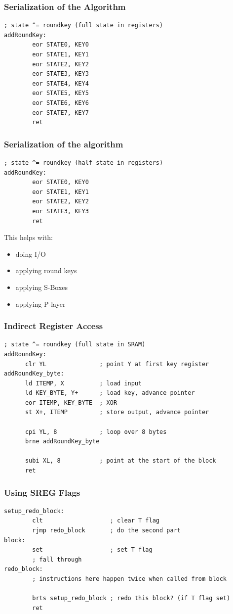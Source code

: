\documentclass{beamer}
\begin{document}
\begin{frame}[fragile]
\frametitle{Serialization of the Algorithm}
\begin{lstlisting}
; state ^= roundkey (full state in registers)
addRoundKey:
        eor STATE0, KEY0
        eor STATE1, KEY1
        eor STATE2, KEY2
        eor STATE3, KEY3
        eor STATE4, KEY4
        eor STATE5, KEY5
        eor STATE6, KEY6
        eor STATE7, KEY7
        ret
\end{lstlisting}
\end{frame}

\begin{frame}[fragile]
\frametitle{Serialization of the algorithm}
\begin{lstlisting}
; state ^= roundkey (half state in registers)
addRoundKey:
        eor STATE0, KEY0
        eor STATE1, KEY1
        eor STATE2, KEY2
        eor STATE3, KEY3
        ret
\end{lstlisting}

This helps with:
\begin{itemize}
        \item doing I/O
        \item applying round keys
        \item applying S-Boxes
        \item applying P-layer
\end{itemize}

\end{frame}

\begin{frame}[fragile]
\frametitle{Indirect Register Access}
\begin{lstlisting}
; state ^= roundkey (full state in SRAM)
addRoundKey:
      clr YL               ; point Y at first key register
addRoundKey_byte:
      ld ITEMP, X          ; load input
      ld KEY_BYTE, Y+      ; load key, advance pointer
      eor ITEMP, KEY_BYTE  ; XOR
      st X+, ITEMP         ; store output, advance pointer

      cpi YL, 8            ; loop over 8 bytes
      brne addRoundKey_byte

      subi XL, 8           ; point at the start of the block
      ret
\end{lstlisting}
\end{frame}

\begin{frame}[fragile]
\frametitle{Using SREG Flags}
\begin{lstlisting}
setup_redo_block:
        clt                   ; clear T flag
        rjmp redo_block       ; do the second part
block:
        set                   ; set T flag
        ; fall through
redo_block:
        ; instructions here happen twice when called from block

        brts setup_redo_block ; redo this block? (if T flag set)
        ret
\end{lstlisting}
\end{frame}
\end{document}
